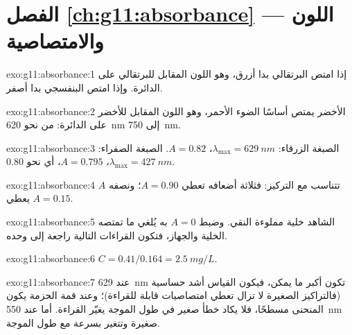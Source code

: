 \section*{الفصل \ref{ch:g11:absorbance} --- اللون والامتصاصية}

\begin{solution}{exo:g11:absorbance:1}
إذا امتص البرتقالي بدا أزرق، وهو اللون المقابل للبرتقالي على الدائرة.
وإذا امتص البنفسجي بدا أصفر.
\end{solution}

\begin{solution}{exo:g11:absorbance:2}
 الأخضر يمتص أساسًا الضوء الأحمر، وهو اللون المقابل للأخضر على
الدائرة: من نحو \qty{620}{nm} إلى \qty{750}{nm}.
\end{solution}

\begin{solution}{exo:g11:absorbance:3}
الصبغة الزرقاء: $\lambda_{\max} = \qty{629}{nm}$، $A = 0.82$. الصبغة الصفراء:
$\lambda_{\max} = \qty{427}{nm}$، $A = 0.795$، أي نحو 0.80.
\end{solution}

\begin{solution}{exo:g11:absorbance:4}
$A$ تتناسب مع التركيز: فثلاثة أضعافه تعطي
$A = 0.90$؛ ونصفه يعطي $A = 0.15$.
\end{solution}

\begin{solution}{exo:g11:absorbance:5}
الشاهد خلية مملوءة  النقي. وضبط $A = 0$ به يُلغي ما تمتصه الخلية 
والجهاز، فتكون القراءات التالية راجعة إلى 
وحده.
\end{solution}

\begin{solution}{exo:g11:absorbance:6}
$C = 0.41 / 0.164 = \qty{2.5}{mg/L}$.
\end{solution}

\begin{solution}{exo:g11:absorbance:7}
عند \qty{629}{nm} تكون  أكبر ما يمكن، فيكون القياس أشد حساسية (فالتراكيز
الصغيرة لا تزال تعطي امتصاصيات قابلة للقراءة)؛ وعند قمة الحزمة يكون المنحنى
مسطحًا، فلا يكاد خطأ صغير في طول الموجة يغيّر القراءة. أما عند \qty{550}{nm}
 صغيرة وتتغير بسرعة مع طول الموجة.
\end{solution}

